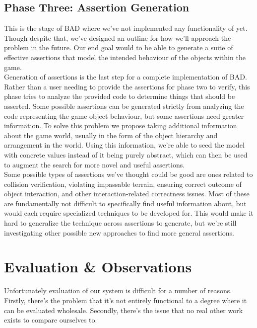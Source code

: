 \documentclass[letterpaper,twocolumn,10pt]{article}
\begin{document}
\subsection{Phase Three: Assertion Generation}

This is the stage of BAD where we've not implemented any functionality of yet. Though despite that, we've designed an outline for how we'll approach the problem in the future. Our end goal would to be able to generate a suite of effective assertions that model the intended behaviour of the objects within the game. \\

Generation of assertions is the last step for a complete implementation of BAD. Rather than a user needing to provide the assertions for phase two to verify, this phase tries to analyze the provided code to determine things that should be asserted. Some possible assertions can be generated strictly from analyzing the code representing the game object behaviour, but some assertions need greater information. To solve this problem we propose taking additional information about the game world, usually in the form of the object hierarchy and arrangement in the world. Using this information, we're able to seed the model with concrete values instead of it being purely abstract, which can then be used to augment the search for more novel and useful assertions. \\

Some possible types of assertions we've thought could be good are ones related to collision verification, violating impassable terrain, ensuring correct outcome of object interaction, and other interaction-related correctness issues. Most of these are fundamentally not difficult to specifically find useful information about, but would each require specialized techniques to be developed for. This would make it hard to generalize the technique across assertions to generate, but we're still investigating other possible new approaches to find more general assertions. \\

\section{Evaluation \& Observations}

Unfortunately evaluation of our system is difficult for a number of reasons. Firstly, there's the problem that it's not entirely functional to a degree where it can be evaluated wholesale. Secondly, there's the issue that no real other work exists to compare ourselves to. \\
\end{document}
